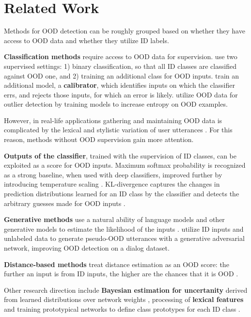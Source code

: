 \documentclass[letterpaper, final]{article} %
\begin{document}
\section{Related Work}

Methods for OOD detection can be roughly grouped based on whether they have access to OOD data and whether they utilize ID labels.

{\bf Classification methods} require access to OOD data for supervision.  \citet{larson2019evaluation} use two supervised settings: 1) binary classification, so that all ID classes are classified against OOD one, and 2) training an additional class for OOD inputs.
\cite{kamath2020selective} train an additional model,  a {\bf calibrator}, which identifies inputs on which the classifier errs, and rejects those inputs, for which an error is likely. \cite{hendrycks2018deep_OE}  utilize OOD data for outlier detection by training models to increase entropy on OOD examples.

However, in real-life applications gathering and maintaining OOD data is complicated by the lexical and stylistic variation of user utterances \cite{rostd_indomain}. For this reason, methods without OOD supervision gain more attention.


{\bf Outputs of the classifier},
trained with the supervision of ID classes, can be exploited as a score for OOD inputs. Maximum softmax probability  \cite{msp}  is recognized as a strong baseline, when used with deep classifiers, improved further by introducing temperature scaling \cite{odin}. KL-divergence captures the changes in prediction distributions learned for an ID class by the classifier and detects the arbitrary guesses made for OOD inputs \cite{yilmaz2020kloos}.


{\bf Generative methods} use a natural ability of language models and other generative models to estimate the likelihood of the inputs \cite{nalisnick2018do,ll_ratio_google}. \cite{zheng2020out} utilize ID inputs and unlabeled data to generate pseudo-OOD utterances with a generative adversarial network, improving  OOD detection on a dialog dataset.

{\bf Distance-based methods} treat distance estimation as an OOD score: the further an input is from ID inputs, the higher are the chances that it is OOD \cite{Mandelbaum2017DistancebasedCS,Gu2019StatisticalAO,Lee2018ASU}.


Other research direction include  {\bf Bayesian estimation for uncertanity} derived from learned distributions over network weights  \cite{NIPS2018_7936, blundell2015weight}, processing of {\bf lexical features} \cite{ghosal2018investigating} and training prototypical networks  to define class prototypes for each ID class \cite{tan2019out}.
\end{document}
